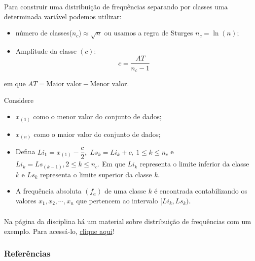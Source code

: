 \documentclass[12pt]{beamer}
\begin{document}
\begin{frame}{}
\frametitle{}
\begin{block}{}
\justifying
Para construir uma distribuição de frequências separando por classes uma determinada variável podemos utilizar:
\begin{itemize}
\item número de classes($n_{c}$)$\approx \sqrt{n}$ ou usamos a regra de Sturges $n_{c}=\ln{(n)};$\pause
\item Amplitude da classe $(c)$: $$c=\dfrac{AT}{n_{c}-1}$$ 
\end{itemize}
em que $AT=\textrm{Maior valor} - \textrm{Menor valor}.$
\end{block}
\end{frame}

\begin{frame}{}
\begin{block}{}
Considere
\begin{itemize}
    \item $x_{(1)}$ como o menor valor do conjunto de dados;
    \item $x_{(n)}$ como o maior valor do conjunto de dados; 
\end{itemize}
\end{block}
\pause
\begin{block}{}
\begin{itemize}
\item Defina $Li_{1}=x_{(1)}-\dfrac{c}{2},$ $Ls_{k}=Li_{k}+c,\ 1\leq k \leq n_{c}$ e
$Li_{k}=Ls_{(k-1)},2 \leq k \leq n_{c}.$ Em que $Li_{k}$ representa o limite inferior da classe $k$ e $Ls_{k}$ representa o limite superior da classe $k.$
\item A frequência absoluta $(f_{a})$ de uma classe $k$ é encontrada contabilizando os valores $x_{1},x_{2},\cdots,x_{n}$ que pertencem ao intervalo $[Li_{k},Ls_{k}).$
\end{itemize}
\end{block}
\end{frame}

\begin{frame}{}
\frametitle{}
\begin{block}{}
\justifying
Na página da disciplina há um material sobre distribuição de frequências com um exemplo. Para acessá-lo, \href{https://rawgit.com/maf105/maf105.github.io/master/Materiais/Dist_freq.pdf}{clique aqui}!
\end{block}
\end{frame}

\begin{frame}%
\frametitle{\bf Referências}
\printbibliography
\end{frame}
\end{document}

